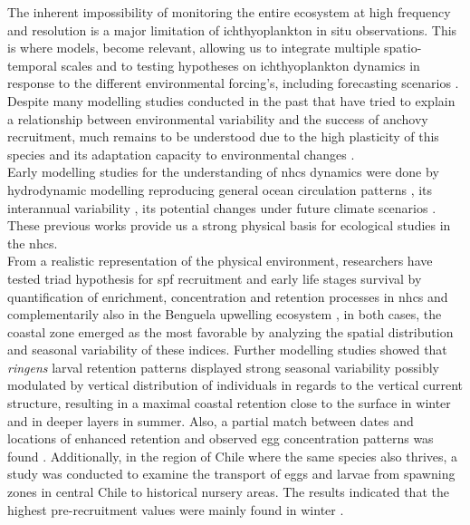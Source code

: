 The inherent impossibility of monitoring the entire ecosystem at high frequency and resolution is a major limitation of ichthyoplankton in situ observations. This is where models, become relevant, allowing us to integrate multiple spatio-temporal scales and to testing hypotheses on ichthyoplankton dynamics in response to the different  environmental forcing’s, including forecasting scenarios \citep{GearDode2020}.\\

Despite many modelling studies conducted in the past \citep{LettPenv2007,BrocLett2008,GutiRami2008,OlivPena2011,XuChai2013} that have tried to explain a relationship between environmental variability and the success of anchovy recruitment, much remains to be understood due to the high plasticity of this species and its adaptation capacity to environmental changes \citep{EspiBert2008,EspiBert2014,CanaAdas2018,PlazCern2018}.\\

Early modelling studies for the understanding of \acrshort{nhcs} dynamics were done by hydrodynamic modelling reproducing general ocean circulation patterns \citep{PenvEche2005,ColaMcwi2012}, its interannual variability \citep{ColaCape2008,EspiEche2017}, its potential changes under future climate scenarios \citep{OerdCola2015,EcheGeva2020}. These previous works provide us a strong physical basis for ecological studies in the \acrshort{nhcs}.\\

From a realistic representation of the physical environment, researchers have tested \cite{Baku1998} triad hypothesis for \acrshort{spf} recruitment and early life stages survival by quantification of enrichment, concentration and retention processes in \acrshort{nhcs} \citep{LettPenv2007} and complementarily also in the Benguela upwelling ecosystem \citep{LettRoy2006}, in both cases, the coastal zone emerged as the most favorable by analyzing the spatial distribution and seasonal variability of these indices. Further modelling studies showed that \textit{\gls{ringens}} larval retention patterns displayed strong seasonal variability possibly modulated by vertical distribution of individuals in regards to the vertical current structure, resulting in a maximal coastal retention close to the surface in winter and in deeper layers in summer. Also, a partial match between dates and locations of enhanced retention and observed egg concentration patterns was found \citep{BrocLett2008}. Additionally, in the region of Chile where the same species also thrives, a study was conducted to examine the transport of eggs and larvae from spawning zones in central Chile to historical nursery areas. The results indicated that the highest pre-recruitment values were mainly found in winter \citep{ParaCola2012}.\\

